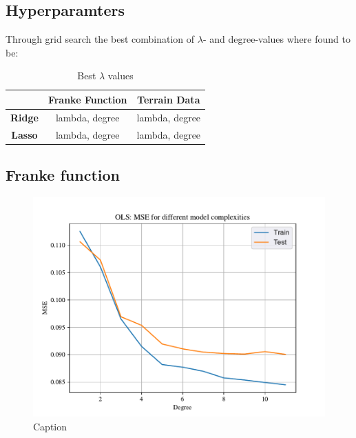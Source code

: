 
\subsection{Hyperparamters}

Through grid search the best combination of $\lambda$- and degree-values where found to be: 

\begin{table}[h!]
    \centering
    \begin{tabular}{|c|c|c|}
        \hline
        & \textbf{Franke Function} & \textbf{Terrain Data} \\ \hline
        \textbf{Ridge} & lambda, degree & lambda, degree \\ \hline
        \textbf{Lasso} & lambda, degree & lambda, degree \\ \hline
    \end{tabular}
    \caption{Best $\lambda$ values}
    \label{tab:my_label}
\end{table}

\subsection{Franke function}

\begin{figure}[h!]
    \centering
    \includegraphics[width=1\linewidth]{project_1_alt/figures/data/OLS_MSE_Franke_Noise.pdf}
    \caption{Caption}
    \label{fig:mseols}
\end{figure}

